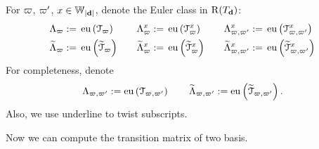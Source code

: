 \begin{defn}
For $\varpi$, $\varpi'$, $x \in \mathbb{W}_{|\mathbf{d}|}$, denote the Euler class in $\operatorname{\operatorname{R}}(T_{\mathbf{d}})$:
\begin{equation*}
\begin{aligned}
  \Lambda_{\varpi}:=\;& \operatorname{\operatorname{eu}}\left(\mathcal{T}_{\varpi}\right) \quad& \Lambda_{\varpi}^x:=\;& \operatorname{\operatorname{eu}}\left(\mathcal{T}_{\varpi}^x\right) \quad& \Lambda_{\varpi,\varpi'}^x:=\;& \operatorname{\operatorname{eu}}\left(\mathcal{T}_{\varpi,\varpi'}^x \right) \\ 
    \widetilde{\Lambda}_{\varpi}:=\;& \operatorname{\operatorname{eu}}\left(\widetilde{\mathcal{T}}_{\varpi}\right) \quad& \widetilde{\Lambda}_{\varpi}^x:=\;& \operatorname{\operatorname{eu}}\left(\widetilde{\mathcal{T}}_{\varpi}^x\right) \quad& \widetilde{\Lambda}_{\varpi,\varpi'}^x:=\;& \operatorname{\operatorname{eu}}\left(\widetilde{\mathcal{T}}_{\varpi,\varpi'}^x\right)  \\ 
\end{aligned}
\end{equation*}
For completeness, denote
$$\Lambda_{\varpi,\varpi'}:=\operatorname{\operatorname{eu}}\left(\mathcal{T}_{\varpi,\varpi'}\right) \qquad \widetilde{\Lambda}_{\varpi,\varpi'}:=\operatorname{\operatorname{eu}}\left(\widetilde{\mathcal{T}}_{\varpi,\varpi'}\right).$$
Also, we use underline to twist subscripts.
\end{defn}

Now we can compute the transition matrix of two basis.

